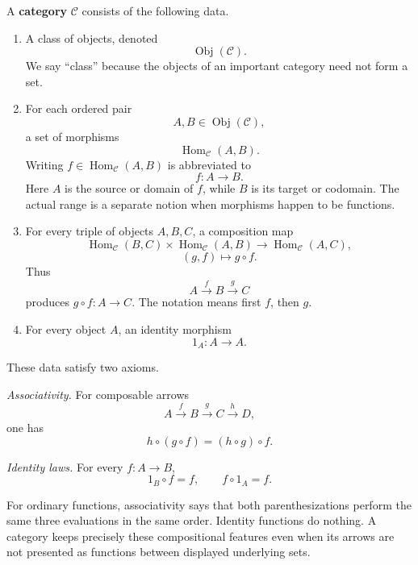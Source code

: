 \begin{definition}[Category]\label{def:category}
A \textbf{category} $\mathcal C$ consists of the following data.
\begin{enumerate}[label=\arabic*.,leftmargin=*]
\item A class of objects, denoted
\[
\operatorname{Obj}(\mathcal C).
\]
We say ``class'' because the objects of an important category need not form a
set.

\item For each ordered pair
\[
A,B\in\operatorname{Obj}(\mathcal C),
\]
a set of morphisms
\[
\operatorname{Hom}_{\mathcal C}(A,B).
\]
Writing $f\in\operatorname{Hom}_{\mathcal C}(A,B)$ is abbreviated to
\[
f:A\longrightarrow B.
\]
Here $A$ is the source or domain of $f$, while $B$ is its target or codomain.
The actual range is a separate notion when morphisms happen to be functions.

\item For every triple of objects $A,B,C$, a composition map
\[
\operatorname{Hom}_{\mathcal C}(B,C)
\times\operatorname{Hom}_{\mathcal C}(A,B)
\longrightarrow\operatorname{Hom}_{\mathcal C}(A,C),
\]
\[
(g,f)\longmapsto g\circ f.
\]
Thus
\[
A\xrightarrow{f}B\xrightarrow{g}C
\]
produces $g\circ f:A\to C$. The notation means first $f$, then $g$.

\item For every object $A$, an identity morphism
\[
1_A:A\longrightarrow A.
\]
\end{enumerate}

These data satisfy two axioms.

\emph{Associativity.} For composable arrows
\[
A\xrightarrow{f}B\xrightarrow{g}C\xrightarrow{h}D,
\]
one has
\[
h\circ(g\circ f)=(h\circ g)\circ f.
\]

\emph{Identity laws.} For every $f:A\to B$,
\[
1_B\circ f=f,
\qquad
f\circ1_A=f.
\]
\end{definition}

For ordinary functions, associativity says that both parenthesizations
perform the same three evaluations in the same order. Identity functions do
nothing. A category keeps precisely these compositional features even when
its arrows are not presented as functions between displayed underlying sets.

